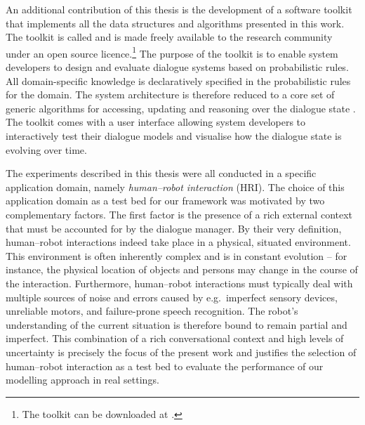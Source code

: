 An additional contribution of this thesis is the development of a software toolkit that implements all the data structures and algorithms presented in this work. The toolkit is called \opendial{}  and is made freely available to the research community under an open source licence.\footnote{The toolkit can be downloaded at .} The purpose of the toolkit is to enable system developers to design and evaluate dialogue systems based on probabilistic rules. All domain-specific knowledge is declaratively specified in the probabilistic rules for the domain. The system architecture is therefore reduced to a core set of generic algorithms for accessing, updating and reasoning over the dialogue state \citep{lison-semdial2012}. The \opendial{} toolkit comes with a user interface allowing system developers to interactively test their dialogue models and visualise how the  dialogue state is evolving over time.  %

The experiments described in this thesis were all conducted in a specific application domain, namely \textit{human--robot interaction}  (HRI).  The choice of this application domain as a test bed for our framework was motivated by two complementary factors.  The first factor is the presence of a rich external context that must be accounted for by the dialogue manager. By their very definition,  human--robot interactions indeed take place in a physical, situated environment.  This environment is often inherently complex and is in constant evolution  -- for instance, the physical location of objects and persons may change in the course of the interaction. Furthermore, human--robot interactions must typically deal with  multiple sources of noise and errors caused by e.g.\ imperfect sensory devices, unreliable motors, and failure-prone speech recognition.  The robot's understanding of the current situation is therefore bound to remain partial and imperfect. This combination of a rich conversational context and high levels of uncertainty is precisely the focus of the present work and justifies the selection of  human--robot interaction as a test bed to evaluate the performance of our modelling approach in real settings.


